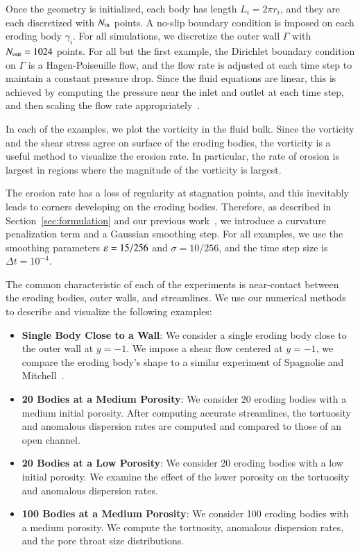 \documentclass[preprint,10pt]{elsarticle}
\begin{document}
Once the geometry is initialized, each body has length $L_i = 2\pi r_i$,
and they are each discretized with $N_{\mathrm{in}}$ points.  A no-slip boundary
condition is imposed on each eroding body $\gamma_i$.  For all
simulations, we discretize the outer wall $\Gamma$ with $N_{\mathrm{out}}=1024$
points.  For all but the first example, the Dirichlet boundary condition
on $\Gamma$ is a Hagen-Poiseuille flow, and the flow rate is adjusted at
each time step to maintain a constant pressure drop. Since the fluid
equations are linear, this is achieved by computing the pressure near
the inlet and outlet at each time step, and then scaling the flow rate
appropriately~\cite{qua-moo2018}.

In each of the examples, we plot the vorticity in the fluid bulk.  Since
the vorticity and the shear stress agree on surface of the eroding
bodies, the vorticity is a useful method to visualize the erosion rate.
In particular, the rate of erosion is largest in regions where the
magnitude of the vorticity is largest.

The erosion rate has a loss of regularity at stagnation points, and this
inevitably leads to corners developing on the eroding bodies.
Therefore, as described in Section~\ref{sec:formulation} and our
previous work~\cite{qua-moo2018}, we introduce a curvature penalization
term and a Gaussian smoothing step.  For all examples, we use the
smoothing parameters $\varepsilon=15/256$ and $\sigma=10/256$, and the time
step size is $\Delta t = 10^{-4}$.

The common characteristic of each of the experiments is near-contact
between the eroding bodies, outer walls, and streamlines. We use our
numerical methods to describe and visualize the following examples:
\begin{itemize}
  \item{\bf Single Body Close to a Wall}: We consider a single eroding
  body close to the outer wall at $y=-1$.  We impose a shear flow
  centered at $y=-1$, we compare the eroding body's shape to a similar
  experiment of Spagnolie and Mitchell~\cite{mit-spa2017}.

  \item{\bf 20 Bodies at a Medium Porosity}: We consider 20 eroding
  bodies with a medium initial porosity.  After computing accurate
  streamlines, the tortuosity and anomalous dispersion rates are
  computed and compared to those of an open channel.

  \item{\bf 20 Bodies at a Low Porosity}: We consider 20 eroding bodies
  with a low initial porosity.  We examine the effect of the lower
  porosity on the tortuosity and anomalous dispersion rates.

  \item{\bf 100 Bodies at a Medium Porosity}: We consider 100 eroding
  bodies with a medium porosity.  We compute the tortuosity, anomalous
  dispersion rates, and the pore throat size distributions.
\end{itemize}
\end{document}
